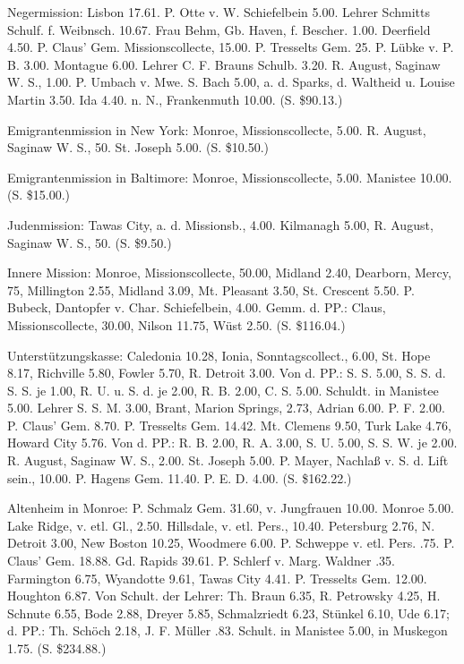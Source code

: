 Negermission: Lisbon 17.61. P. Otte v. W. Schiefelbein 5.00. Lehrer Schmitts Schulf. f. Weibnsch. 10.67. Frau Behm, Gb. Haven, f. Bescher. 1.00. Deerfield 4.50. P. Claus’ Gem. Missionscollecte, 15.00. P. Tresselts Gem. 25. P. Lübke v. P. B. 3.00. Montague 6.00. Lehrer C. F. Brauns Schulb. 3.20. R. August, Saginaw W. S., 1.00. P. Umbach v. Mwe. S. Bach 5.00, a. d. Sparks, d. Waltheid u. Louise Martin 3.50. Ida 4.40. n. N., Frankenmuth 10.00. (S. \$90.13.)

Emigrantenmission in New York: Monroe, Missionscollecte, 5.00. R. August, Saginaw W. S., 50. St. Joseph 5.00. (S. \$10.50.)

Emigrantenmission in Baltimore: Monroe, Missionscollecte, 5.00. Manistee 10.00. (S. \$15.00.)

Judenmission: Tawas City, a. d. Missionsb., 4.00. Kilmanagh 5.00, R. August, Saginaw W. S., 50. (S. \$9.50.)

Innere Mission: Monroe, Missionscollecte, 50.00, Midland 2.40, Dearborn, Mercy, 75, Millington 2.55, Midland 3.09, Mt. Pleasant 3.50, St. Crescent 5.50. P. Bubeck, Dantopfer v. Char. Schiefelbein, 4.00. Gemm. d. PP.: Claus, Missionscollecte, 30.00, Nilson 11.75, Wüst 2.50. (S. \$116.04.)

Unterstützungskasse: Caledonia 10.28, Ionia, Sonntagscollect., 6.00, St. Hope 8.17, Richville 5.80, Fowler 5.70, R. Detroit 3.00. Von d. PP.: S. S. 5.00, S. S. d. S. S. je 1.00, R. U. u. S. d. je 2.00, R. B. 2.00, C. S. 5.00. Schuldt. in Manistee 5.00. Lehrer S. S. M. 3.00, Brant, Marion Springs, 2.73, Adrian 6.00. P. F. 2.00. P. Claus’ Gem. 8.70. P. Tresselts Gem. 14.42. Mt. Clemens 9.50, Turk Lake 4.76, Howard City 5.76. Von d. PP.: R. B. 2.00, R. A. 3.00, S. U. 5.00, S. S. W. je 2.00. R. August, Saginaw W. S., 2.00. St. Joseph 5.00. P. Mayer, Nachlaß v. S. d. Lift sein., 10.00. P. Hagens Gem. 11.40. P. E. D. 4.00. (S. \$162.22.)

Altenheim in Monroe: P. Schmalz Gem. 31.60, v. Jungfrauen 10.00. Monroe 5.00. Lake Ridge, v. etl. Gl., 2.50. Hillsdale, v. etl. Pers.,
10.40. Petersburg 2.76, N. Detroit 3.00, New Boston 10.25, Woodmere 6.00. P. Schweppe v. etl. Pers. .75. P. Claus’ Gem. 18.88. Gd. Rapids 39.61. P. Schlerf v. Marg. Waldner .35. Farmington 6.75, Wyandotte 9.61, Tawas City 4.41. P. Tresselts Gem. 12.00. Houghton 6.87. Von Schult. der Lehrer: Th. Braun 6.35, R. Petrowsky 4.25, H. Schnute 6.55, Bode 2.88, Dreyer 5.85, Schmalzriedt 6.23, Stünkel 6.10, Ude 6.17; d. PP.: Th. Schöch 2.18, J. F. Müller .83. Schult. in Manistee 5.00, in Muskegon 1.75. (S. \$234.88.)

